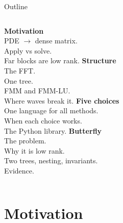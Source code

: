\documentclass[aspectratio=169,10pt,t]{beamer}
\begin{document}
\begin{frame}{Outline}
\vspace{4mm}
\begin{columns}[T,onlytextwidth]
{\bfseries Motivation}\\[1mm]
\footnotesize PDE $\to$ dense matrix.\\ Apply vs solve.\\ Far blocks are low rank.
{\bfseries Structure}\\[1mm]
\footnotesize The FFT.\\ One tree.\\ FMM and FMM-LU.\\ Where waves break it.
{\bfseries Five choices}\\[1mm]
\footnotesize One language for all methods.\\ When each choice works.\\ The Python library.
{\bfseries Butterfly}\\[1mm]
\footnotesize The problem.\\ Why it is low rank.\\ Two trees, nesting, invariants.\\ Evidence.
\end{columns}
\vspace{8mm}
\begin{center}
\end{center}
\end{frame}

\section{Motivation}
\end{document}
